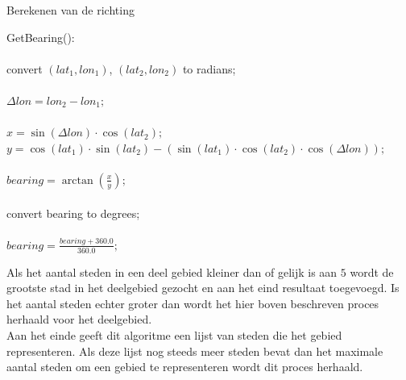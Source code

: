 \documentclass[twoside,openright]{uva-bachelor-thesis}
\begin{document}
			\begin{algorithm}
				\caption{Berekenen van de richting}
				\label{alg:bearing}
				\mbox{GetBearing():}\\[0.5cm]
				\mbox{}\\
				convert $(lat_1, lon_1)$, $(lat_2, lon_2)$ to radians;\\
				\mbox{}\\
				$\Delta lon = lon_2 - lon_1;$\\
				\mbox{}\\
				$x = \sin(\Delta lon) \cdot \cos(lat_2);$\\
				$y = \cos(lat_1) \cdot \sin(lat_2) - (\sin(lat_1) \cdot \cos(lat_2) \cdot \cos(\Delta lon));$\\
				\mbox{}\\
				$bearing = \arctan(\frac{x}{y});$\\
				\mbox{}\\
				convert bearing to degrees;\\
				\mbox{}\\
				$bearing = \frac{bearing + 360.0}{360.0};$\\
			\end{algorithm}
			Als het aantal steden in een deel gebied kleiner dan of gelijk is aan $5$ wordt de grootste stad in het deelgebied gezocht en aan het eind resultaat toegevoegd. Is het aantal steden echter groter dan wordt het hier boven beschreven proces herhaald voor het deelgebied. \\[0.5cm]
			Aan het einde geeft dit algoritme een lijst van steden die het gebied representeren. Als deze lijst nog steeds meer steden bevat dan het maximale aantal steden om een gebied te representeren wordt dit proces herhaald.
\end{document}
